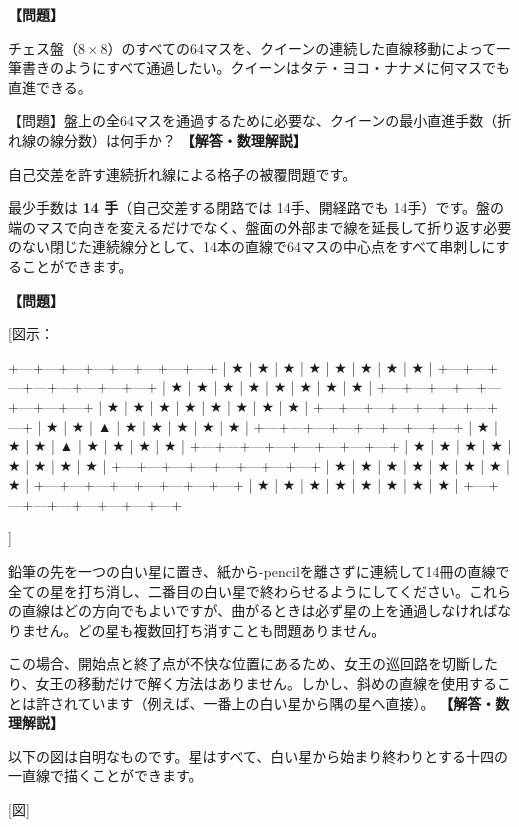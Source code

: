 \documentclass[10pt,a4paper,oneside,openany]{ltjsbook}
\begin{document}
\begin{tcolorbox}[colback=softblue,colframe=primaryblue,title=\textbf{第 328 問：クイーンの最小巡回手数（折れ線経路問題） （原題: THE QUEEN'S TOUR.）},arc=2mm,boxrule=1pt,breakable]
\textbf{【問題】}\par\vspace{0.3em}
チェス盤（$8 \times 8$）のすべての64マスを、クイーンの連続した直線移動によって一筆書きのようにすべて通過したい。クイーンはタテ・ヨコ・ナナメに何マスでも直進できる。

【問題】盤上の全64マスを通過するために必要な、クイーンの最小直進手数（折れ線の線分数）は何手か？
\tcblower
\textbf{【解答・数理解説】}\par\vspace{0.3em}
自己交差を許す連続折れ線による格子の被覆問題です。

最少手数は \textbf{14 手}（自己交差する閉路では 14手、開経路でも 14手）です。盤の端のマスで向きを変えるだけでなく、盤面の外部まで線を延長して折り返す必要のない閉じた連続線分として、14本の直線で64マスの中心点をすべて串刺しにすることができます。
\end{tcolorbox}

\begin{tcolorbox}[colback=softblue,colframe=primaryblue,title=\textbf{第 329 問：THE STAR PUZZLE.},arc=2mm,boxrule=1pt,breakable]
\textbf{【問題】}\par\vspace{0.3em}

[図示：

    +---+---+---+---+---+---+---+---+
    | ★ | ★ | ★ | ★ | ★ | ★ | ★ | ★ |
    +---+---+---+---+---+---+---+---+
    | ★ | ★ | ★ | ★ | ★ | ★ | ★ | ★ |
    +---+---+---+---+---+---+---+---+
    | ★ | ★ | ★ | ★ | ★ | ★ | ★ | ★ |
    +---+---+---+---+---+---+---+---+
    | ★ | ★ | ▲ | ★ | ★ | ★ | ★ | ★ |
    +---+---+---+---+---+---+---+---+
    | ★ | ★ | ★ | ▲ | ★ | ★ | ★ | ★ |
    +---+---+---+---+---+---+---+---+
    | ★ | ★ | ★ | ★ | ★ | ★ | ★ | ★ |
    +---+---+---+---+---+---+---+---+
    | ★ | ★ | ★ | ★ | ★ | ★ | ★ | ★ |
    +---+---+---+---+---+---+---+---+
    | ★ | ★ | ★ | ★ | ★ | ★ | ★ | ★ |
    +---+---+---+---+---+---+---+---+

]

鉛筆の先を一つの白い星に置き、紙から-pencilを離さずに連続して14冊の直線で全ての星を打ち消し、二番目の白い星で終わらせるようにしてください。これらの直線はどの方向でもよいですが、曲がるときは必ず星の上を通過しなければなりません。どの星も複数回打ち消すことも問題ありません。

この場合、開始点と終了点が不快な位置にあるため、女王の巡回路を切斷したり、女王の移動だけで解く方法はありません。しかし、斜めの直線を使用することは許されています（例えば、一番上の白い星から隅の星へ直接）。
\tcblower
\textbf{【解答・数理解説】}\par\vspace{0.3em}
以下の図は自明なものです。星はすべて、白い星から始まり終わりとする十四の一直線で描くことができます。

[図]
\end{tcolorbox}
\end{document}
